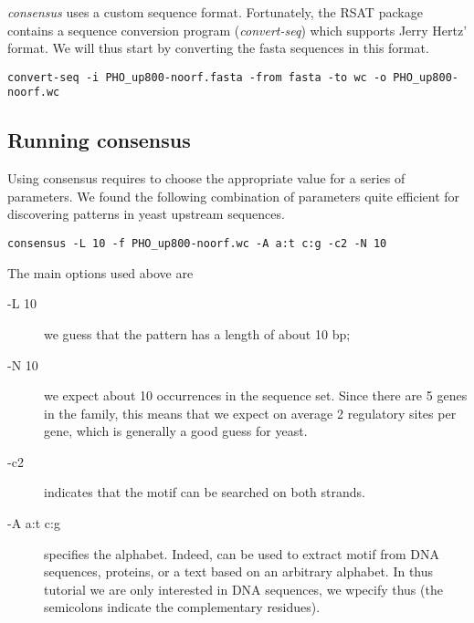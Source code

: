 \textit{consensus} uses a custom sequence format. Fortunately, the RSAT
package contains a sequence conversion program (\textit{convert-seq})
which supports Jerry Hertz' format. We will thus start by converting
the fasta sequences in this format. 

{\color{Blue} \begin{footnotesize} 
\begin{verbatim}
convert-seq -i PHO_up800-noorf.fasta -from fasta -to wc -o PHO_up800-noorf.wc
\end{verbatim} \end{footnotesize}
}


\subsection{Running consensus}

Using consensus requires to choose the appropriate value for a series
of parameters. We found the following combination of parameters quite
efficient for discovering patterns in yeast upstream sequences.

{\color{Blue} \begin{footnotesize} 
\begin{verbatim}
consensus -L 10 -f PHO_up800-noorf.wc -A a:t c:g -c2 -N 10
\end{verbatim} \end{footnotesize}
}

The main options used above are

\begin{description}
\item[-L 10] we guess that the pattern has a length of about 10 bp;

\item[-N 10] we expect about 10 occurrences in the sequence set. Since
there are 5 genes in the family, this means that we expect on average
2 regulatory sites per gene, which is generally a good guess for
yeast.

\item[-c2] indicates  that the motif can be searched
  on both strands.

\item[-A a:t c:g] specifies the alphabet. Indeed, 
  can be used to extract motif from DNA sequences, proteins, or a text
  based on an arbitrary alphabet. In thus tutorial we are only
  interested in DNA sequences, we wpecify thus 
  (the semicolons indicate the complementary residues).
\end{description}

